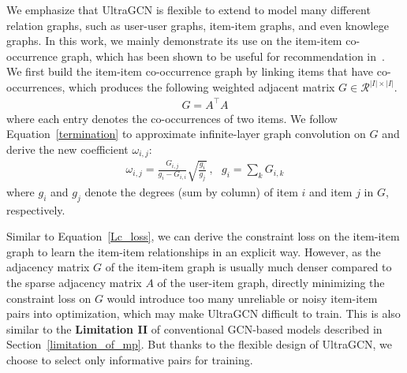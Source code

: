 \documentclass[sigconf,authorversion]{acmart}
\begin{document}
We emphasize that UltraGCN is flexible to extend to model many different relation graphs, such as user-user graphs, item-item graphs, and even knowlege graphs. In this work, we mainly demonstrate its use on the item-item co-occurrence graph, which has been shown to be useful for recommendation in~\cite{M2GRL}. We first build the item-item co-occurrence graph by linking items that have co-occurrences, which produces the following weighted adjacent matrix $G \in \mathcal{R}^{|I| \times |I|}$. 
\begin{eqnarray}
G = A^{\top}A
\end{eqnarray}
where each entry denotes the co-occurrences of two items. We follow Equation~\ref{termination} to approximate infinite-layer graph convolution on $G$ and derive the new coefficient $\omega_{i, j}$:
\begin{eqnarray}
 \omega_{i, j} = \frac{G_{i, j}}{g_i-G_{i, i}} \sqrt{\frac{g_i}{g_{j}}}~, \:\:\: g_i=\sum_kG_{i,k}
\end{eqnarray}
where $g_i$ and $g_{j}$ denote the degrees (sum by column) of item $i$ and item $j$ in $G$, respectively.

Similar to Equation~\ref{Lc_loss}, we can derive the constraint loss on the item-item graph to learn the item-item relationships in an explicit way.
However, as the adjacency matrix $G$ of the item-item graph is usually much denser compared to the sparse adjacency matrix $A$ of the user-item graph, directly minimizing the constraint loss on $G$ would introduce too many unreliable or noisy item-item pairs into optimization, which may make UltraGCN difficult to train. This is also similar to the \textbf{Limitation II} of conventional GCN-based models described in Section~\ref{limitation_of_mp}. But thanks to the flexible design of UltraGCN, we choose to select only informative pairs for training.  
\end{document}

